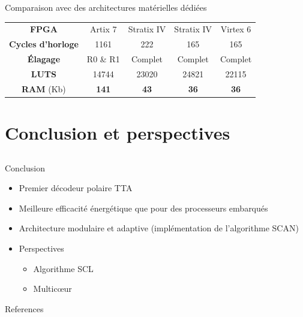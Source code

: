\documentclass[t,compress,mathserif,12pt,xcolor=dvipsnames]{beamer}
\begin{document}
\begin{frame}[c]{Comparaison avec des architectures matérielles dédiées}
{\begin{table}
{{\begin{tabular}{c|c|c|c|c}
					\textbf{FPGA}         &  Artix 7       & Stratix IV            & Stratix IV         & Virtex 6             \\
					\textbf{Cycles d'horloge}   &  1161          & 222                   & 165                & 165                  \\
					\textbf{\'Elagage}        &  R0 \& R1      & Complet                  & Complet               & Complet                  \\
					\textbf{LUTS}           &  14744         & 23020                 & 24821              & 22115                \\
					\textbf{RAM} (Kb)       &  \textbf{141}  & \textbf{43}           & \textbf{36}        & \textbf{36}          \\


				\end{tabular}
			}}
			\end{table}
		}
\end{frame}

\section{Conclusion et perspectives}
\subsection*{}

\begin{frame}[c]{Conclusion}

	\begin{itemize}
		\item<+-> Premier décodeur polaire TTA
		\vspace{0.3cm}
		\item<+-> Meilleure efficacité énergétique que pour des processeurs embarqués
		\vspace{0.3cm}
		\item<+-> Architecture modulaire et adaptive (implémentation de l'algorithme SCAN)
		\vspace{0.3cm}
		\item<+-> Perspectives
		\begin{itemize}
			\item<+-> Algorithme SCL
			\item<+-> Multicœur
		\end{itemize}
	\end{itemize}

\end{frame}

\begin{frame}[allowframebreaks]{References}
\printbibliography
\end{frame}
\end{document}
